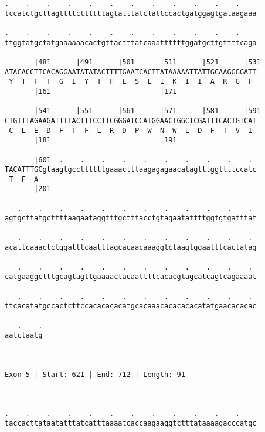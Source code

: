 \documentclass{article}
\begin{document}
\begin{Verbatim}
.    .    .    .    .    .    .    .    .    .    .    .    
tccatctgcttagttttcttttttagtatttatctattccactgatggagtgataagaaa
                                                            
.    .    .    .    .    .    .    .    .    .    .    .    
ttggtatgctatgaaaaaacactgttactttatcaaattttttggatgcttgttttcaga
                                                            
       |481      |491      |501      |511      |521      |531
ATACACCTTCACAGGAATATATACTTTTGAATCACTTATAAAAATTATTGCAAGGGGATT
 Y  T  F  T  G  I  Y  T  F  E  S  L  I  K  I  I  A  R  G  F 
       |161                          |171                   
  
       |541      |551      |561      |571      |581      |591
CTGTTTAGAAGATTTTACTTTCCTTCGGGATCCATGGAACTGGCTCGATTTCACTGTCAT
 C  L  E  D  F  T  F  L  R  D  P  W  N  W  L  D  F  T  V  I 
       |181                          |191                   
  
       |601  .    .    .    .    .    .    .    .    .    . 
TACATTTGCgtaagtgccttttttgaaactttaagagagaacatagtttggttttccatc
 T  F  A                                                    
       |201                                                 
  
   .    .    .    .    .    .    .    .    .    .    .    . 
agtgcttatgcttttaagaataggtttgctttacctgtagaatattttggtgtgatttat
                                                            
   .    .    .    .    .    .    .    .    .    .    .    . 
acattcaaactctggatttcaatttagcacaacaaaggtctaagtggaatttcactatag
                                                            
   .    .    .    .    .    .    .    .    .    .    .    . 
catgaaggctttgcagtagttgaaaactacaattttcacacgtagcatcagtcagaaaat
                                                            
   .    .    .    .    .    .    .    .    .    .    .    . 
ttcacatatgccactcttccacacacacatgcacaaacacacacacatatgaacacacac
                                                            
   .    .
aatctaatg
         
         
 
Exon 5 | Start: 621 | End: 712 | Length: 91



.    .    .    .    .    .    .    .    .    .    .    .    
taccacttataatatttatcatttaaaatcaccaagaaggtctttataaaagacccatgc
                                                            

\end{Verbatim}
\end{document}
